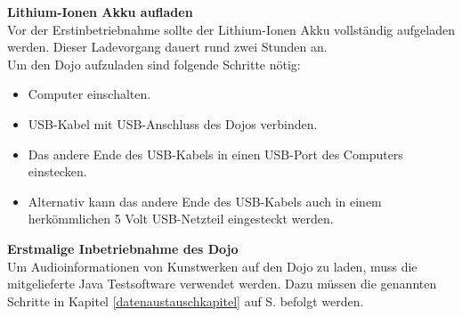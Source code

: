 \textbf{Lithium-Ionen Akku aufladen}
\\[4mm]
Vor der Erstinbetriebnahme sollte der Lithium-Ionen Akku vollständig aufgeladen werden. Dieser Ladevorgang dauert rund zwei Stunden an.
\\[4mm]
Um den Dojo aufzuladen sind folgende Schritte nötig:
\begin{itemize}
\item Computer einschalten.
\end{itemize}
\begin{itemize}
\item USB-Kabel mit USB-Anschluss des Dojos verbinden.
\end{itemize}
\begin{itemize}
\item Das andere Ende des USB-Kabels in einen USB-Port des Computers einstecken.
\end{itemize}
\begin{itemize}
\item Alternativ kann das andere Ende des USB-Kabels auch in einem herkömmlichen 5 Volt USB-Netzteil eingesteckt werden.
\end{itemize}
\textbf{Erstmalige Inbetriebnahme des Dojo}
\\[4mm]
Um Audioinformationen von Kunstwerken auf den Dojo zu laden, muss die mitgelieferte Java Testsoftware verwendet werden. Dazu müssen die genannten Schritte in Kapitel \ref{datenaustauschkapitel} auf S.\pageref{datenaustauschkapitel} befolgt werden.